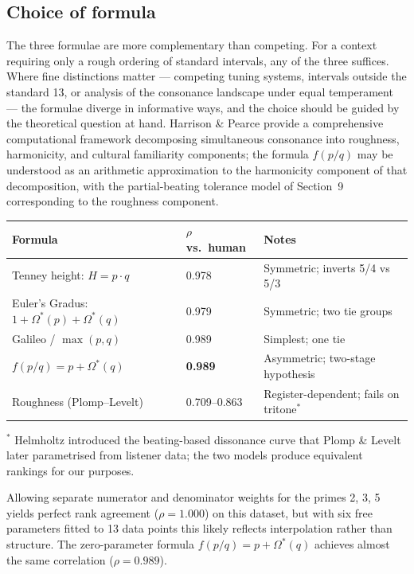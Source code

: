 \documentclass[11pt,a4paper]{article}
\newcommand{\Os}{\Omega^{\!*}}
\begin{document}
\subsection*{Choice of formula}
The three formulae are more complementary than competing. For a context
requiring only a rough ordering of standard intervals, any of the three
suffices. Where fine distinctions matter --- competing tuning systems,
intervals outside the standard 13, or analysis of the consonance landscape
under equal temperament --- the formulae diverge in informative ways, and the
choice should be guided by the theoretical question at hand. Harrison \&
Pearce \cite{harrisonpearce2020} provide a comprehensive computational
framework decomposing simultaneous consonance into roughness, harmonicity,
and cultural familiarity components; the formula $f(p/q)$ may be understood
as an arithmetic approximation to the harmonicity component of that
decomposition, with the partial-beating tolerance model of Section~9
corresponding to the roughness component.

\medskip
\begin{tabular}{lll}
\toprule
Formula & $\rho$ vs.\ human & Notes \\
\midrule
Tenney height: $H = p \cdot q$          & 0.978 & Symmetric; inverts 5/4 vs 5/3 \\
Euler's Gradus: $1 + \Os(p) + \Os(q)$ & 0.979 & Symmetric; two tie groups \\
Galileo / $\max(p,q)$                  & 0.989 & Simplest; one tie \\
$f(p/q) = p + \Os(q)$                  & \textbf{0.989} & Asymmetric; two-stage hypothesis \\
Roughness (Plomp--Levelt)              & 0.709--0.863 & Register-dependent; fails on tritone$^*$ \\
\bottomrule
\end{tabular}

\medskip
\noindent$^*$ Helmholtz \cite{helmholtz1863} introduced the beating-based
dissonance curve that Plomp \& Levelt \cite{plomplevelt1965} later parametrised
from listener data; the two models produce equivalent rankings for our
purposes.

\medskip\noindent
Allowing separate numerator and denominator weights for the primes 2, 3, 5
yields perfect rank agreement ($\rho = 1.000$) on this dataset, but with
six free parameters fitted to 13 data points this likely reflects
interpolation rather than structure. The zero-parameter formula
$f(p/q) = p + \Os(q)$ achieves almost the same correlation ($\rho = 0.989$).
\end{document}
